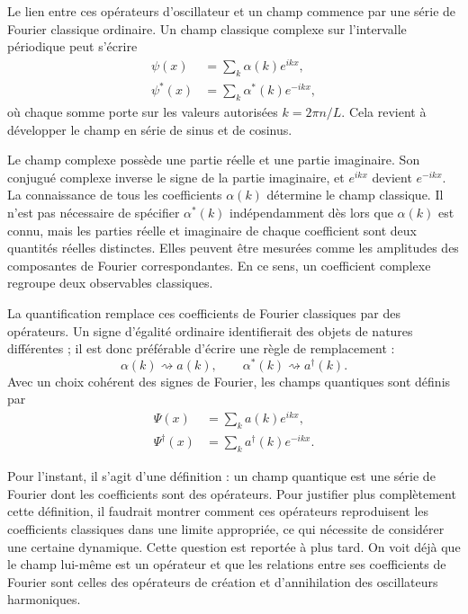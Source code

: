 Le lien entre ces opérateurs d’oscillateur et un champ commence par une série de Fourier classique ordinaire. Un champ classique complexe sur l’intervalle périodique peut s’écrire
\begin{align}
\psi(x)&=\sum_k \alpha(k)e^{ikx},\\
\psi^*(x)&=\sum_k \alpha^*(k)e^{-ikx},
\end{align}
où chaque somme porte sur les valeurs autorisées \(k=2\pi n/L\). Cela revient à développer le champ en série de sinus et de cosinus.

Le champ complexe possède une partie réelle et une partie imaginaire. Son conjugué complexe inverse le signe de la partie imaginaire, et \(e^{ikx}\) devient \(e^{-ikx}\). La connaissance de tous les coefficients \(\alpha(k)\) détermine le champ classique. Il n’est pas nécessaire de spécifier \(\alpha^*(k)\) indépendamment dès lors que \(\alpha(k)\) est connu, mais les parties réelle et imaginaire de chaque coefficient sont deux quantités réelles distinctes. Elles peuvent être mesurées comme les amplitudes des composantes de Fourier correspondantes. En ce sens, un coefficient complexe regroupe deux observables classiques.

La quantification remplace ces coefficients de Fourier classiques par des opérateurs. Un signe d’égalité ordinaire identifierait des objets de natures différentes ; il est donc préférable d’écrire une règle de remplacement :
\begin{equation}
\alpha(k)\rightsquigarrow a(k),
\qquad
\alpha^*(k)\rightsquigarrow a^\dagger(k).
\end{equation}
Avec un choix cohérent des signes de Fourier, les champs quantiques sont définis par
\begin{align}
\Psi(x)&=\sum_k a(k)e^{ikx},\\
\Psi^\dagger(x)&=\sum_k a^\dagger(k)e^{-ikx}.
\end{align}

Pour l’instant, il s’agit d’une définition : un champ quantique est une série de Fourier dont les coefficients sont des opérateurs. Pour justifier plus complètement cette définition, il faudrait montrer comment ces opérateurs reproduisent les coefficients classiques dans une limite appropriée, ce qui nécessite de considérer une certaine dynamique. Cette question est reportée à plus tard. On voit déjà que le champ lui-même est un opérateur et que les relations entre ses coefficients de Fourier sont celles des opérateurs de création et d’annihilation des oscillateurs harmoniques.

